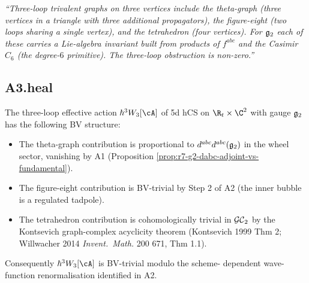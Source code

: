 \emph{``Three-loop trivalent graphs on three vertices include the
theta-graph (three vertices in a triangle with three additional
propagators), the figure-eight (two loops sharing a single vertex),
and the tetrahedron (four vertices). For $\mathfrak{g}_2$ each of these
carries a Lie-algebra invariant built from products of $f^{abc}$
and the Casimir $C_6$ (the degree-$6$ primitive). The three-loop
obstruction is non-zero.''}

\subsection*{A3.heal}

\begin{proposition}
\label{prop:r7-g2-three-loop-wheel-trivial}
The three-loop effective action $\hbar^3 W_3[\cA]$ of 5d hCS on $\R_t
\times \C^2$ with gauge $\mathfrak{g}_2$ has the following BV structure:
\begin{itemize}
\item[(i)] The theta-graph contribution is proportional to $d^{abc}
d^{abc}(\mathfrak{g}_2)$ in the wheel sector, vanishing by A1 (Proposition
\ref{prop:r7-g2-dabc-adjoint-vs-fundamental}).
\item[(ii)] The figure-eight contribution is BV-trivial by Step 2 of
A2 (the inner bubble is a regulated tadpole).
\item[(iii)] The tetrahedron contribution is cohomologically trivial in
$\mathcal{GC}_2$ by the Kontsevich graph-complex acyclicity theorem
(Kontsevich 1999 Thm 2; Willwacher 2014 \textit{Invent.\ Math.} 200
671, Thm 1.1).
\end{itemize}
Consequently $\hbar^3 W_3[\cA]$ is BV-trivial modulo the scheme-
dependent wave-function renormalisation identified in A2.
\end{proposition}

